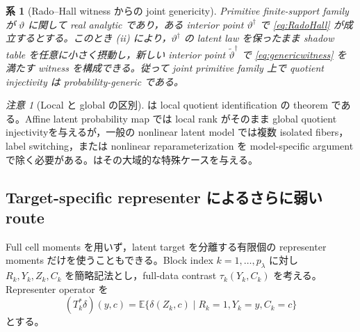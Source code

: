 \documentclass[11pt,a4paper]{ltjsarticle}
\newtheorem{corollary}{系}[section]
\theoremstyle{remark}
\newtheorem{remark}{注意}[section]
\newcommand{\E}{\mathbb E}
\begin{document}
\begin{corollary}[Rado--Hall witness からの joint genericity]\label{cor:radoanalyticgeneric}
Primitive finite-support family が $\vartheta$ に関して real analytic であり，ある interior point $\vartheta^\dagger$ で \eqref{eq:RadoHall} が成立するとする。このとき (ii) により，$\vartheta^\dagger$ の latent law を保ったまま shadow table を任意に小さく摂動し，新しい interior point $\widetilde\vartheta^\dagger$ で \eqref{eq:genericwitness} を満たす witness を構成できる。従って joint primitive family 上で quotient injectivity は probability-generic である。
\end{corollary}

\begin{remark}[Local と global の区別]\label{rem:genericweak}
は local quotient identification の theorem である。Affine latent probability map では local rank がそのまま global quotient injectivityを与えるが，一般の nonlinear latent model では複数 isolated fibers，label switching，または nonlinear reparameterization を model-specific argument で除く必要がある。はその大域的な特殊ケースを与える。
\end{remark}

\subsection{Target-specific representer によるさらに弱い route}
Full cell moments を用いず，latent target を分離する有限個の representer moments だけを使うこともできる。Block index $k=1,\ldots,p_\lambda$ に対し $R_k,Y_k,Z_k,C_k$ を簡略記法とし，full-data contrast $\tau_k(Y_k,C_k)$ を考える。Representer operator を
\[
(T_k^*\delta)(y,c)
=\E\{\delta(Z_k,c)\mid R_k=1,Y_k=y,C_k=c\}
\]
とする。
\end{document}
